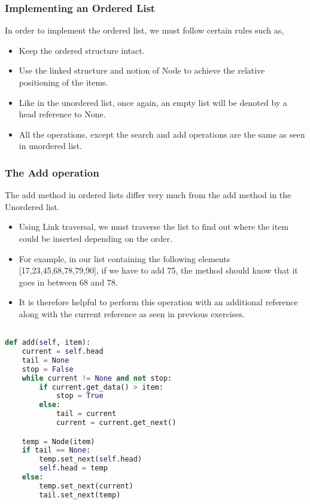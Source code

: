\documentclass{beamer}
\begin{document}
\begin{frame}
\frametitle{Implementing an Ordered List}
In order to implement the ordered list, we must follow certain rules such as, 

\begin{itemize}
\item Keep the ordered structure intact.
\item Use the linked structure and notion of Node to achieve the relative positioning of the items.
\item Like in the unordered list, once again, an empty list will be denoted by a head reference to None.
\item All the operations, except the search and add operations are the same as seen in unordered list.
\end{itemize}
\end{frame}

\begin{frame}
\frametitle{The Add operation}
The add method in ordered lists differ very much from the add method in the Unordered list.

\begin{itemize}
\item Using Link traversal, we must traverse the list to find out where the item could be inserted depending on the order.

\item For example, in our list containing the following elements [17,23,45,68,78,79,90], if we have to add 75, the method should know that it goes in between 68 and 78.

\item It is therefore helpful to perform this operation with an additional reference along with the current reference as seen in previous exercises. 

\end{itemize}
\end{frame}
\begin{frame}[fragile]
\begin{lstlisting}[language=Python]

def add(self, item):
	current = self.head
	tail = None
	stop = False
	while current != None and not stop:
 		if current.get_data() > item:
 			stop = True
 		else:
			tail = current
			current = current.get_next()

	temp = Node(item)
	if tail == None:
		temp.set_next(self.head)
		self.head = temp
	else:
		temp.set_next(current)
		tail.set_next(temp)
\end{lstlisting}
\end{frame}
\end{document}
